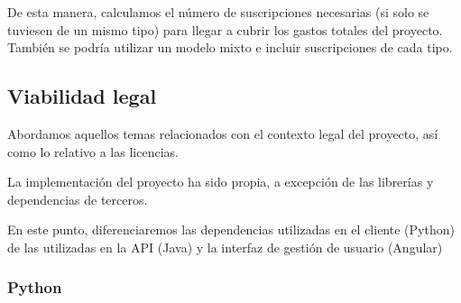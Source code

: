 De esta manera, calculamos el número de suscripciones necesarias (si solo se tuviesen de un mismo tipo)
para llegar a cubrir los gastos totales del proyecto.
También se podría utilizar un modelo mixto e incluir suscripciones de cada tipo.

\subsection{Viabilidad legal}

Abordamos aquellos temas relacionados con el contexto legal del proyecto, así como lo relativo a las licencias.

La implementación del proyecto ha sido propia, a excepción de las librerías y dependencias de terceros.

En este punto, diferenciaremos las dependencias utilizadas en el cliente (Python) de las utilizadas en la API (Java) y
la interfaz de gestión de usuario (Angular)

\subsubsection{Python}

